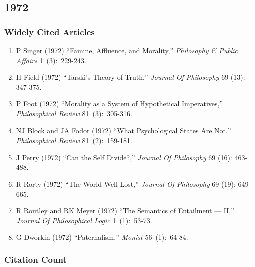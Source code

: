 \documentclass[
  10pt,
  letterpaper,
  DIV=11,
  numbers=noendperiod,
  twoside]{scrartcl}
\providecommand{\tightlist}{%
  \setlength{\itemsep}{0pt}\setlength{\parskip}{0pt}}\usepackage{longtable,booktabs,array}
\begin{document}
\newpage

\subsection{1972}\label{sec-s1972}

\subsubsection*{Widely Cited Articles}\label{widely-cited-articles-16}

\begin{enumerate}
\def\labelenumi{\arabic{enumi}.}
\tightlist
\item
  P Singer (1972) ``Famine, Affluence, and Morality,'' \emph{Philosophy
  \& Public Affairs} 1~(3):~229-243.
\item
  H Field (1972) ``Tarski's Theory of Truth,'' \emph{Journal Of
  Philosophy} 69 (13): 347-375.
\item
  P Foot (1972) ``Morality as a System of Hypothetical Imperatives,''
  \emph{Philosophical Review} 81~(3):~305-316.
\item
  NJ Block and JA Fodor (1972) ``What Psychological States Are Not,''
  \emph{Philosophical Review} 81~(2):~159-181.
\item
  J Perry (1972) ``Can the Self Divide?,'' \emph{Journal Of Philosophy}
  69 (16): 463-488.
\item
  R Rorty (1972) ``The World Well Lost,'' \emph{Journal Of Philosophy}
  69 (19): 649-665.
\item
  R Routley and RK Meyer (1972) ``The Semantics of Entailment --- II,''
  \emph{Journal Of Philosophical Logic} 1~(1):~53-73.
\item
  G Dworkin (1972) ``Paternalism,'' \emph{Monist} 56~(1):~64-84.
\end{enumerate}

\subsubsection*{Citation Count}\label{sec-count-1972}
\end{document}
